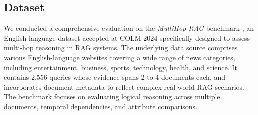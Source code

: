 \documentclass[11pt]{article}
\begin{document}




\subsection{Dataset}

We conducted a comprehensive evaluation on the \textit{MultiHop-RAG} benchmark \citep{17}, an English-language dataset accepted at COLM 2024 specifically designed to assess multi-hop reasoning in RAG systems. The underlying data source comprises various English-language websites covering a wide range of news categories, including entertainment, business, sports, technology, health, and science. It contains 2{,}556 queries whose evidence spans 2 to 4 documents each, and incorporates document metadata to reflect complex real-world RAG scenarios. The benchmark focuses on evaluating logical reasoning across multiple documents, temporal dependencies, and attribute comparisons.
\end{document}
